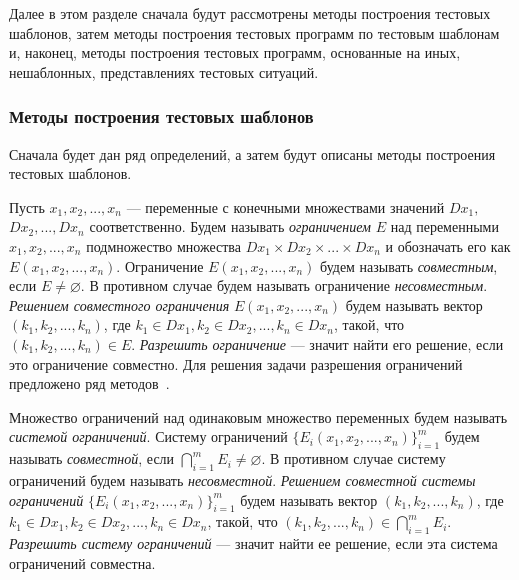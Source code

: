 Далее в этом разделе сначала будут рассмотрены методы построения тестовых шаблонов, затем методы построения тестовых программ по тестовым шаблонам и, наконец, методы построения тестовых программ, основанные на иных, нешаблонных, представлениях тестовых ситуаций.


\subsubsection{Методы построения тестовых шаблонов}%

Сначала будет дан ряд определений, а затем будут описаны методы построения тестовых шаблонов.

Пусть $x_1, x_2, ..., x_n$ --- переменные с конечными множествами значений $Dx_1,$ $Dx_2, ..., Dx_n$ соответственно. Будем называть \emph{ограничением} $E$ над переменными $x_1, x_2, ..., x_n$ подмножество множества $Dx_1 \times Dx_2 \times ... \times Dx_n$ и обозначать его как $E(x_1, x_2, ..., x_n)$. Ограничение $E(x_1, x_2, ..., x_n)$ будем называть \emph{совместным}, если $E \neq \varnothing$. В противном случае будем называть ограничение \emph{несовместным}. \emph{Решением совместного ограничения} $E(x_1, x_2, ..., x_n)$ будем называть вектор $(k_1, k_2, ..., k_n)$, где $k_1 \in Dx_1, k_2 \in Dx_2, ..., k_n \in Dx_n$, такой, что $(k_1, k_2, ..., k_n) \in E$. \emph{Разрешить ограничение} --- значит найти его решение, если это ограничение совместно. Для решения задачи разрешения ограничений предложено ряд методов~\cite{CLPusingECLiPSe}.

Множество ограничений над одинаковым множество переменных будем называть \emph{системой ограничений}. Систему ограничений $\{E_i(x_1, x_2, ..., x_n)\}_{i=1}^m$ будем называть \emph{совместной}, если $\bigcap_{i=1}^m E_i \neq \varnothing$. В противном случае систему ограничений будем называть \emph{несовместной}. \emph{Решением совместной системы ограничений} $\{E_i(x_1, x_2, ..., x_n)\}_{i=1}^m$ будем называть вектор $(k_1, k_2, ..., k_n)$, где $k_1 \in Dx_1, k_2 \in Dx_2, ..., k_n \in Dx_n$, такой, что $(k_1, k_2, ..., k_n) \in \bigcap_{i=1}^m E_i$. \emph{Разрешить систему ограничений} --- значит найти ее решение, если эта система ограничений совместна.

